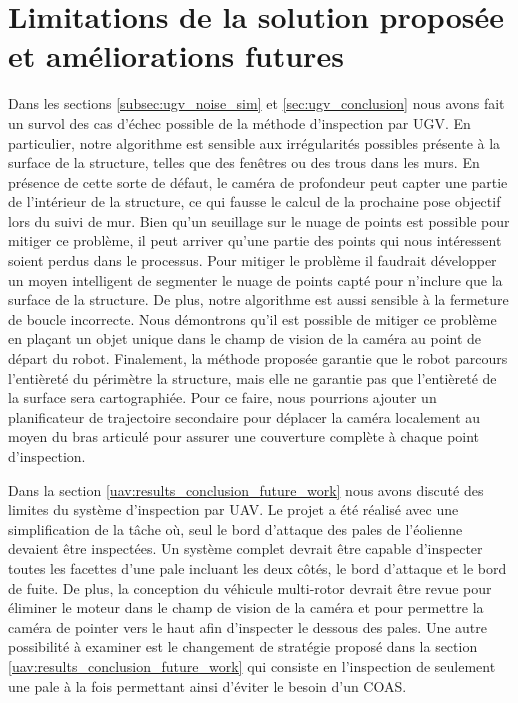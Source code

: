 \section{Limitations de la solution proposée et améliorations futures}\label{sec:Limitations}

Dans les sections \ref{subsec:ugv_noise_sim} et \ref{sec:ugv_conclusion} nous avons fait un survol des cas d'échec possible de la méthode d'inspection par UGV. En particulier, notre algorithme est sensible aux irrégularités possibles présente à la surface de la structure, telles que des fenêtres ou des trous dans les murs. En présence de cette sorte de défaut, le caméra de profondeur peut capter une partie de l'intérieur de la structure, ce qui fausse le calcul de la prochaine pose objectif lors du suivi de mur. Bien qu'un seuillage sur le nuage de points est possible pour mitiger ce problème, il peut arriver qu'une partie des points qui nous intéressent soient perdus dans le processus. Pour mitiger le problème il faudrait développer un moyen intelligent de segmenter le nuage de points capté pour n'inclure que la surface de la structure. De plus, notre algorithme est aussi sensible à la fermeture de boucle incorrecte. Nous démontrons qu'il est possible de mitiger ce problème en plaçant un objet unique dans le champ de vision de la caméra au point de départ du robot. Finalement, la méthode proposée garantie que le robot parcours l'entièreté du périmètre la structure, mais elle ne garantie pas que l'entièreté de la surface sera cartographiée. Pour ce faire, nous pourrions ajouter un planificateur de trajectoire secondaire pour déplacer la caméra localement au moyen du bras articulé pour assurer une couverture complète à chaque point d'inspection.

Dans la section \ref{uav:results_conclusion_future_work} nous avons discuté des limites du système d'inspection par UAV. Le projet a été réalisé avec une simplification de la tâche où, seul le bord d'attaque des pales de l'éolienne devaient être inspectées. Un système complet devrait être capable d'inspecter toutes les facettes d'une pale incluant les deux côtés, le bord d'attaque et le bord de fuite. De plus, la conception du véhicule multi-rotor devrait être revue pour éliminer le moteur dans le champ de vision de la caméra et pour permettre la caméra de pointer vers le haut afin d'inspecter le dessous des pales. Une autre possibilité à examiner est le changement de stratégie proposé dans la section \ref{uav:results_conclusion_future_work} qui consiste en l'inspection de seulement une pale à la fois permettant ainsi d'éviter le besoin d'un COAS.

